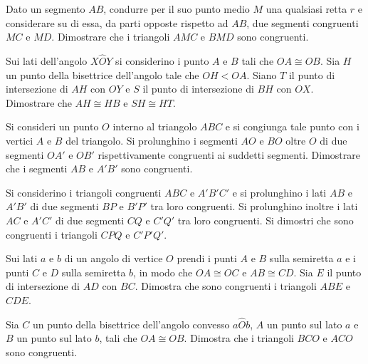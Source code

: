 \begin{multicols}{2}
\begin{esercizio}
\label{ese:2.19}
Dato un segmento $AB$, condurre per il suo punto medio $M$ una 
qualsiasi retta $r$ e considerare su di essa, da parti opposte 
rispetto ad $AB$, due segmenti congruenti $MC$ e $MD$. Dimostrare che 
i triangoli $AMC$ e $BMD$ sono congruenti.
\end{esercizio}

\begin{esercizio}
\label{ese:2.20}
Sui lati dell'angolo $X\widehat{O}Y$ si considerino i punto $A$ e $B$ 
tali che $OA\cong OB$. Sia $H$ un punto della bisettrice dell'angolo 
tale che $OH<OA$. Siano $T$ il punto di intersezione di $AH$ con $OY$ 
e $S$ il punto di intersezione di $BH$ con $OX$. Dimostrare che 
$AH\cong HB$ e $SH\cong HT$.
\end{esercizio}

\begin{esercizio}
\label{ese:2.21}
Si consideri un punto $O$ interno al triangolo $ABC$ e si congiunga 
tale punto con i vertici $A$ e $B$ del triangolo. Si prolunghino i 
segmenti $AO$ e $BO$ oltre $O$ di due segmenti $OA'$ e $OB'$ 
rispettivamente congruenti ai suddetti segmenti. Dimostrare che i 
segmenti $AB$ e $A'B'$ sono congruenti.
\end{esercizio}

\begin{esercizio}
\label{ese:2.22}
Si considerino i triangoli congruenti $ABC$ e $A'B'C'$ e si 
prolunghino i lati $AB$ e $A'B'$ di due segmenti $BP$ e $B'P'$ tra 
loro congruenti. Si prolunghino inoltre i lati $AC$ e $A'C'$ di due 
segmenti $CQ$ e $C'Q'$ tra loro congruenti. Si dimostri che sono 
congruenti i triangoli $CPQ$ e $C'P'Q'$.
\end{esercizio}

\begin{esercizio}
\label{ese:2.23}
Sui lati $a$ e $b$ di un angolo di vertice $O$ prendi i punti $A$ e 
$B$ sulla semiretta $a$ e i punti $C$ e $D$ sulla semiretta $b$, in 
modo che $OA\cong OC$ e $AB\cong CD$. Sia $E$ il punto di 
intersezione di $AD$ con $BC$. Dimostra che sono congruenti i 
triangoli $ABE$ e $CDE$.
\end{esercizio}

\begin{esercizio}
\label{ese:2.24}
Sia $C$ un punto della bisettrice dell'angolo convesso 
$a\widehat{O}b$, $A$ un punto sul lato $a$ e $B$ un punto sul lato 
$b$, tali che $OA\cong OB$. Dimostra che i triangoli $BCO$ e $ACO$ 
sono congruenti.
\end{esercizio}


\end{multicols}

